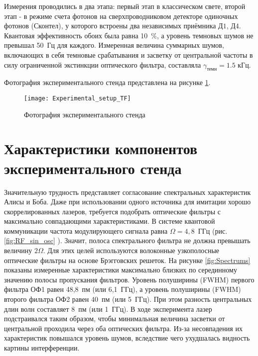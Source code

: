 Измерения проводились в два этапа: первый этап в классическом свете, второй этап - в режиме счета фотонов на сверхпроводниковом детекторе одиночных фотонов (Сконтел), у которого встроены два независимых приёмника $Д1$, $Д4$. Квантовая эффективность обоих была равна 10~\%, а уровень темновых шумов не превышал 50~Гц для каждого. Измеренная величина суммарных шумов, включающих в себя темновые срабатывания и засветку от центральной частоты в силу ограниченной экстинкции оптического фильтра, составляла $\gamma_{темн}=1.5$ кГц.

Фотография экспериментального стенда представлена на рисунке \ref{fig:experimental_setup_TF}.  

 \begin{figure}[ht]
  \centering
	 \texttt{[image: Experimental\_setup\_TF]}
  \caption{Фотография экспериментального стенда}
  \label{fig:experimental_setup_TF}
\end{figure}

\pagebreak

\section{Характеристики компонентов экспериментального стенда} \label{ch:ch5/sec2}

Значительную трудность представляет согласование спектральных характеристик Алисы и Боба. Даже при использовании одного источника для имитации хорошо скоррелированных лазеров, требуется подобрать оптические фильтры с максимально совпадающими характеристиками. В системе квантовой коммуникации частота модулирующего сигнала равна $\Omega = 4,8$~ГГц (рис.\ref{fig:RF_sin_osc} ). Значит, полоса спектрального фильтра не должна превышать величину $2\Omega$. Для этих целей используются волоконные узкополосные оптические фильтры на основе Брэгговских решеток. На рисунке \ref{fig:Spectrums} показаны измеренные характеристики максимально близких по серединному значению полосы пропускания фильтров. Уровень полуширины (FWHM) первого фильтра ОФ1 равен 48,8~пм (или 6,1~ГГц), а уровень полуширины (FWHM) второго фильтра ОФ2 равен 40~пм (или 5~ГГц). При этом разность центральных длин волн составляет 8~пм (или 1~ГГц). В ходе эксперимента лазер подстраивался таким образом, чтобы минимальная величина засветки от центральной проходила через оба оптических фильтра. Из-за несовпадения их характеристик повышался уровень шумов, вследствие чего ухудшалась видность картины интерференции.  

